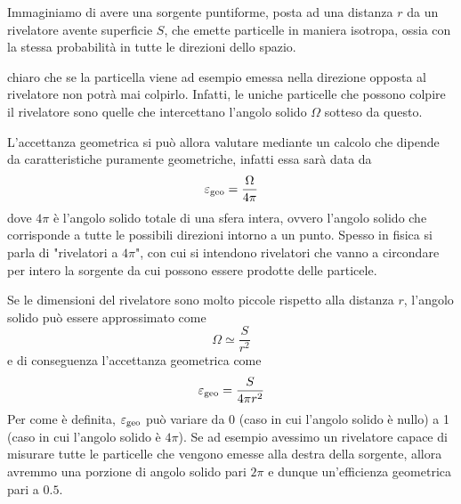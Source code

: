 \begin{esempio}
   Immaginiamo di avere una sorgente puntiforme, posta ad una distanza $r$ da un rivelatore avente superficie $S$, che emette particelle in maniera isotropa, ossia con la stessa probabilità in tutte le direzioni dello spazio.
   \begin{figure}[H]
      \centering
   \end{figure}
   \E chiaro che se la particella viene ad esempio emessa nella direzione opposta al rivelatore non potrà mai colpirlo. Infatti, le uniche particelle che possono colpire il rivelatore sono quelle che intercettano l'angolo solido $\Omega$ sotteso da questo.
    
   L'accettanza geometrica si può allora valutare mediante un calcolo che dipende da caratteristiche puramente geometriche, infatti essa sarà data da
   \begin{equation*}
      \varepsilon_{\rm geo}=\frac{\Omega}{4\pi}
   \end{equation*}
   dove $4\pi$ è l'angolo solido totale di una sfera intera, ovvero l'angolo solido che corrisponde a tutte le possibili direzioni intorno a un punto. Spesso in fisica si parla di "rivelatori a $4\pi$", con cui si intendono rivelatori che vanno a circondare per intero la sorgente da cui possono essere prodotte delle particele.

   Se le dimensioni del rivelatore sono molto piccole rispetto alla distanza $r$, l'angolo solido può essere approssimato come
   \begin{equation*}
      \Omega \simeq \frac{S}{r^2}
   \end{equation*}
   e di conseguenza l'accettanza geometrica come
   \begin{equation*}
      \varepsilon_{\rm geo}=\frac{S}{4\pi r^2}
   \end{equation*}
   Per come è definita, $\varepsilon_{\rm geo}$ può variare da 0 (caso in cui l'angolo solido è nullo) a 1 (caso in cui l'angolo solido è $4\pi$). Se ad esempio avessimo un rivelatore capace di misurare tutte le particelle che vengono emesse alla destra della sorgente, allora avremmo una porzione di angolo solido pari $2 \pi$ e dunque un'efficienza geometrica pari a $0.5$.
\end{esempio}

